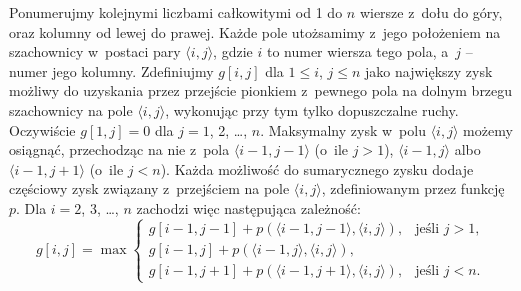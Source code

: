 Ponumerujmy kolejnymi liczbami całkowitymi od 1 do $n$ wiersze z~dołu do góry, oraz kolumny od lewej do prawej.
Każde pole utożsamimy z~jego położeniem na szachownicy w~postaci pary $\langle i,j\rangle$, gdzie $i$ to numer wiersza tego pola, a~$j$ -- numer jego kolumny.
Zdefiniujmy $g[i,j]$ dla $1\le i$, $j\le n$ jako największy zysk możliwy do uzyskania przez przejście pionkiem z~pewnego pola na dolnym brzegu szachownicy na pole $\langle i,j\rangle$, wykonując przy tym tylko dopuszczalne ruchy.
Oczywiście $g[1,j]=0$ dla $j=1$, 2, \dots, $n$.
Maksymalny zysk w~polu $\langle i,j\rangle$ możemy osiągnąć, przechodząc na nie z~pola $\langle i-1,j-1\rangle$ (o~ile $j>1$), $\langle i-1,j\rangle$ albo $\langle i-1,j+1\rangle$ (o~ile $j<n$).
Każda możliwość do sumarycznego zysku dodaje częściowy zysk związany z~przejściem na pole $\langle i,j\rangle$, zdefiniowanym przez funkcję $p$.
Dla $i=2$, 3, \dots, $n$ zachodzi więc następująca zależność:
\[
	g[i,j] = \max\begin{cases}
		g[i-1,j-1]+p(\langle i-1,j-1\rangle,\langle i,j\rangle), & \text{jeśli $j>1$,} \\
		g[i-1,j]+p(\langle i-1,j\rangle,\langle i,j\rangle), & \\
		g[i-1,j+1]+p(\langle i-1,j+1\rangle,\langle i,j\rangle), & \text{jeśli $j<n$.}
	\end{cases}
\]

